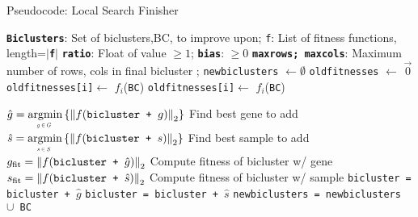 \begin{algorithm}

	\label{alg:hillclimber}
    \caption{Pseudocode: Local Search Finisher}
  	\begin{algorithmic}[1]
    \Statex \hspace{15pt} \texttt{\bf Biclusters}: Set of biclusters,BC, to improve upon;     \Statex \hspace{15pt} \texttt{f}: List of fitness functions, length=$|$\texttt{\bf f}$|$
     \Statex \hspace{15pt}  \texttt{\bf ratio}: Float of value $ \geq 1$;   \texttt{\bf bias}: $ \geq 0$
     \Statex \hspace{15pt} \texttt{\bf maxrows; maxcols}: Maximum number of rows, cols in final bicluster ; 
    \Statex
    	\State \texttt{newbiclusters} $\gets \emptyset$
    	    \State \texttt{oldfitnesses} $\gets$ $\vec{0}$
    	    \Statex
        	        \State \texttt{oldfitnesses[i]}$\gets$ $f_i$(\texttt{BC})
    	    \EndFor
    	    \Statex
    	        \Statex
    	            \State \texttt{oldfitnesses[i]}$\gets$ $f_i$(\texttt{BC})
    	        \EndFor
    	        \Statex
    	        
    	        \State $\hat{g} = \argmin{g \in G} \left\{ \norm{f(\texttt{bicluster +\ } g)}_2 \right\}$ \Comment Find best gene to add
    	       \Statex \hspace{20pt} 
	            \State $\hat{s} = \argmin{s \in S} \left\{ \norm{f(\texttt{bicluster +\ } s)}_2 \right\}$
	            \Comment Find best sample to add
	            \State $g_{\text{fit}} = \left\lVert f(\texttt{bicluster +\ } \hat{g})\right\rVert_2$
	            \Comment Compute fitness of bicluster w/ gene 
	            \State $s_{\text{fit}} = \left\lVert f(\texttt{bicluster +\ } \hat{s})\right\rVert_2$
	            \Comment Compute fitness of bicluster w/ sample
	            \Statex
	                \State \texttt{bicluster = bicluster + $\hat{g}$}
	                \State \texttt{bicluster = bicluster + $\hat{s}$}
	            \Else
	            \EndIf
	            \Statex
    	    \EndWhile
    	    \State \texttt{newbiclusters = newbiclusters $\cup$ BC}
    	    \Statex
    	\EndFor
  	\end{algorithmic}
\end{algorithm}
